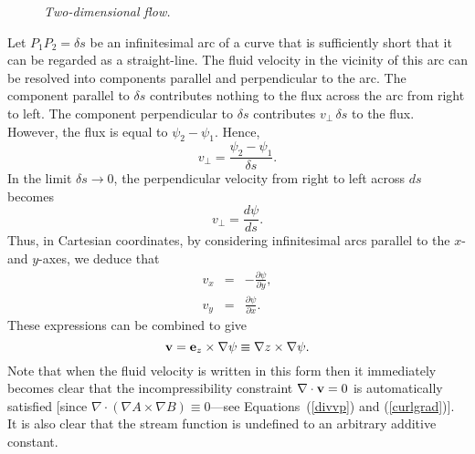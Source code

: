 \begin{figure}
\epsfysize=2.5in
\centerline{}
\caption{\em Two-dimensional flow.}\label{fstream1}
\end{figure}

Let $P_1 P_2=\delta s$ be an infinitesimal arc of a curve that is sufficiently short that it can be regarded as a straight-line.
The fluid velocity in the vicinity of this arc can be resolved into components parallel and perpendicular to the arc. 
The component parallel to $\delta s$ contributes nothing to the flux across the arc from right to left. The component perpendicular to
$\delta s$ contributes $v_\perp\,\delta s$ to the flux. However, the flux is equal to $\psi_2-\psi_1$. Hence,
\begin{equation}
v_\perp = \frac{\psi_2-\psi_1}{\delta s}.
\end{equation}
In the limit $\delta s\rightarrow 0$, the perpendicular velocity from right to left across $ds$ becomes
\begin{equation}
v_\perp = \frac{d\psi}{ds}.
\end{equation}
Thus, in Cartesian coordinates, by considering infinitesimal arcs parallel to the $x$- and $y$-axes, we deduce that
\begin{eqnarray}\label{e3.42}
v_x &=& -\frac{\partial\psi}{\partial y},\\[0.5ex]
v_y&=&\frac{\partial\psi}{\partial x}.\label{e3.43}
\end{eqnarray}
These expressions can be combined to give
\begin{equation}\label{e3.44}
{\bf v} = {\bf e}_z\times \nabla\psi\equiv \nabla z\times \nabla \psi.
\end{equation}
Note that when the fluid velocity is written in this form then it immediately becomes clear
that the incompressibility constraint $\nabla\cdot{\bf v}=0$ is automatically
 satisfied [since $\nabla\cdot(\nabla A\times \nabla B)\equiv 0$---see Equations~(\ref{divvp}) and (\ref{curlgrad})]. 
It is also clear that the stream function is undefined to an arbitrary additive constant. 

